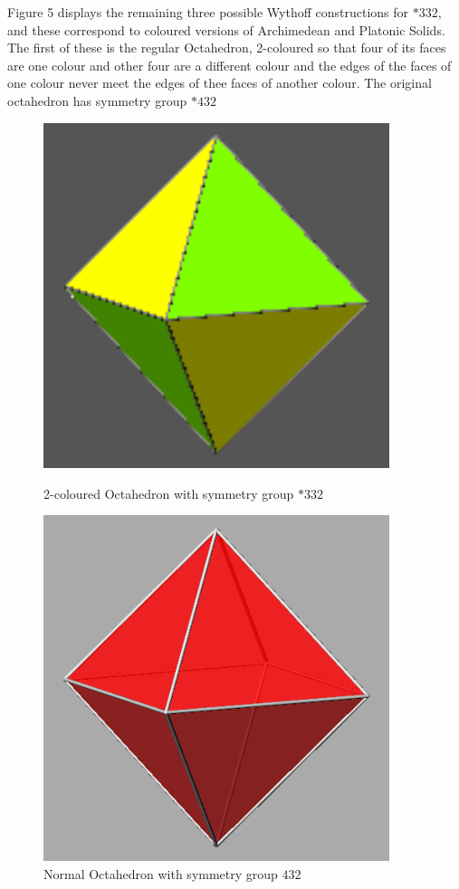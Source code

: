 \documentclass{article}
\begin{document}
Figure 5 displays the remaining three possible Wythoff constructions for $*332$, and these correspond to coloured versions of Archimedean and Platonic Solids. The first of these is the regular Octahedron, 2-coloured so that four of its faces are one colour and other four are a different colour and the edges of the faces of one colour never meet the edges of thee faces of another colour. The original octahedron has symmetry group $*432$
\begin{figure}[htbp]
    \centering
    \begin{minipage}{0.3\textwidth}
        \centering
        \includegraphics[width=0.9\textwidth]{Coloured Octahedron.png} 
        \caption{2-coloured Octahedron with symmetry group $*332$}
    \end{minipage}\hfill
    \begin{minipage}{0.3\textwidth}
        \centering
        \includegraphics[width=0.9\textwidth]{Octahedron.png} 
        \caption{Normal Octahedron with symmetry group $432$}
    \end{minipage}
\end{figure}
\end{document}
